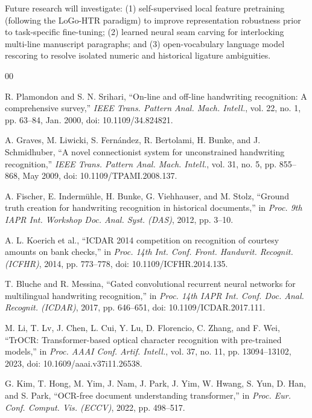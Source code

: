 \documentclass{IEEEtran}
\begin{document}
Future research will investigate: (1) self-supervised local feature pretraining (following the LoGo-HTR paradigm) to improve representation robustness prior to task-specific fine-tuning; (2) learned neural seam carving for interlocking multi-line manuscript paragraphs; and (3) open-vocabulary language model rescoring to resolve isolated numeric and historical ligature ambiguities.

\begin{thebibliography}{00}

 R. Plamondon and S. N. Srihari, ``On-line and off-line handwriting recognition: A comprehensive survey,'' \emph{IEEE Trans. Pattern Anal. Mach. Intell.}, vol. 22, no. 1, pp. 63--84, Jan. 2000, doi: 10.1109/34.824821.

 A. Graves, M. Liwicki, S. Fern{\'a}ndez, R. Bertolami, H. Bunke, and J. Schmidhuber, ``A novel connectionist system for unconstrained handwriting recognition,'' \emph{IEEE Trans. Pattern Anal. Mach. Intell.}, vol. 31, no. 5, pp. 855--868, May 2009, doi: 10.1109/TPAMI.2008.137.

 A. Fischer, E. Inderm{\"u}hle, H. Bunke, G. Viehhauser, and M. Stolz, ``Ground truth creation for handwriting recognition in historical documents,'' in \emph{Proc. 9th IAPR Int. Workshop Doc. Anal. Syst. (DAS)}, 2012, pp. 3--10.

 A. L. Koerich et al., ``ICDAR 2014 competition on recognition of courtesy amounts on bank checks,'' in \emph{Proc. 14th Int. Conf. Front. Handwrit. Recognit. (ICFHR)}, 2014, pp. 773--778, doi: 10.1109/ICFHR.2014.135.

 T. Bluche and R. Messina, ``Gated convolutional recurrent neural networks for multilingual handwriting recognition,'' in \emph{Proc. 14th IAPR Int. Conf. Doc. Anal. Recognit. (ICDAR)}, 2017, pp. 646--651, doi: 10.1109/ICDAR.2017.111.

 M. Li, T. Lv, J. Chen, L. Cui, Y. Lu, D. Florencio, C. Zhang, and F. Wei, ``TrOCR: Transformer-based optical character recognition with pre-trained models,'' in \emph{Proc. AAAI Conf. Artif. Intell.}, vol. 37, no. 11, pp. 13094--13102, 2023, doi: 10.1609/aaai.v37i11.26538.

 G. Kim, T. Hong, M. Yim, J. Nam, J. Park, J. Yim, W. Hwang, S. Yun, D. Han, and S. Park, ``OCR-free document understanding transformer,'' in \emph{Proc. Eur. Conf. Comput. Vis. (ECCV)}, 2022, pp. 498--517.


\end{thebibliography}
\end{document}
